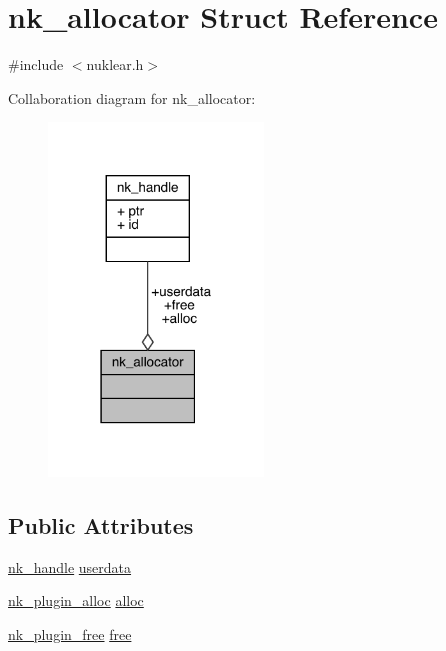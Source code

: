 \hypertarget{structnk__allocator}{}\section{nk\+\_\+allocator Struct Reference}
\label{structnk__allocator}


{\ttfamily \#include $<$nuklear.\+h$>$}



Collaboration diagram for nk\+\_\+allocator\+:
\nopagebreak
\begin{figure}[H]
\begin{center}
\leavevmode
\includegraphics[width=162pt]{structnk__allocator__coll__graph}
\end{center}
\end{figure}
\subsection*{Public Attributes}
\begin{DoxyCompactItemize}
\item 
\mbox{\hyperlink{unionnk__handle}{nk\+\_\+handle}} \mbox{\hyperlink{structnk__allocator_a15aa4d412b676a8578ed07f73eac6455}{userdata}}
\item 
\mbox{\hyperlink{nuklear_8h_adfbbdf36c71cbe9f11c87fda00126cb0}{nk\+\_\+plugin\+\_\+alloc}} \mbox{\hyperlink{structnk__allocator_ad99f758ced10853bb1cb6f56b6c586f9}{alloc}}
\item 
\mbox{\hyperlink{nuklear_8h_aa6efffb60b73f429d5d4cce5a6fd4045}{nk\+\_\+plugin\+\_\+free}} \mbox{\hyperlink{structnk__allocator_af190be0e199490790ccc1f2877c2d77e}{free}}
\end{DoxyCompactItemize}


